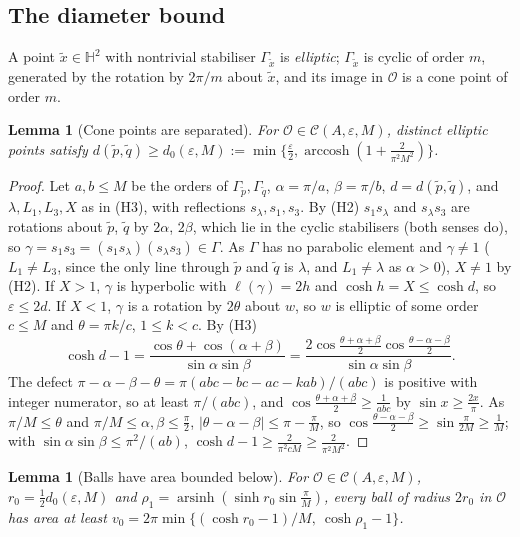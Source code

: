 \documentclass[pdflatex,sn-mathphys-num]{sn-jnl}
\theoremstyle{thmstyleone}%
\newtheorem{lemma}[theorem]{Lemma}%
\theoremstyle{thmstylethree}%
\newcommand{\Orb}{\mathcal{O}}
\newcommand{\Cl}{\mathcal{C}}
\newcommand{\Hb}{\mathbb{H}^2}
\begin{document}
\subsection{The diameter bound}

A point $\tilde x\in\Hb$ with nontrivial stabiliser $\Gamma_{\tilde x}$ is \emph{elliptic}; $\Gamma_{\tilde x}$ is cyclic of order $m$, generated by the rotation by $2\pi/m$ about $\tilde x$, and its image in $\Orb$ is a cone point of order $m$.

\begin{lemma}[Cone points are separated]\label{lem:sep}
For $\Orb\in\Cl(A,\varepsilon,M)$, distinct elliptic points satisfy $d(\tilde p,\tilde q)\ge d_0(\varepsilon,M):=\min\{\frac\varepsilon2,\operatorname{arccosh}(1+\frac2{\pi^2M^2})\}$.
\end{lemma}

\begin{proof}
Let $a,b\le M$ be the orders of $\Gamma_{\tilde p},\Gamma_{\tilde q}$, $\alpha=\pi/a$, $\beta=\pi/b$, $d=d(\tilde p,\tilde q)$, and $\lambda,L_1,L_3,X$ as in (H3), with reflections $s_\lambda,s_1,s_3$. By (H2) $s_1s_\lambda$ and $s_\lambda s_3$ are rotations about $\tilde p$, $\tilde q$ by $2\alpha$, $2\beta$, which lie in the cyclic stabilisers (both senses do), so $\gamma=s_1s_3=(s_1s_\lambda)(s_\lambda s_3)\in\Gamma$. As $\Gamma$ has no parabolic element and $\gamma\ne1$ ($L_1\ne L_3$, since the only line through $\tilde p$ and $\tilde q$ is $\lambda$, and $L_1\ne\lambda$ as $\alpha>0$), $X\ne1$ by (H2). If $X>1$, $\gamma$ is hyperbolic with $\ell(\gamma)=2h$ and $\cosh h=X\le\cosh d$, so $\varepsilon\le2d$. If $X<1$, $\gamma$ is a rotation by $2\theta$ about $w$, so $w$ is elliptic of some order $c\le M$ and $\theta=\pi k/c$, $1\le k<c$. By (H3)
\[
  \cosh d-1=\frac{\cos\theta+\cos(\alpha+\beta)}{\sin\alpha\sin\beta}=\frac{2\cos\frac{\theta+\alpha+\beta}2\cos\frac{\theta-\alpha-\beta}2}{\sin\alpha\sin\beta}.
\]
The defect $\pi-\alpha-\beta-\theta=\pi(abc-bc-ac-kab)/(abc)$ is positive with integer numerator, so at least $\pi/(abc)$, and $\cos\frac{\theta+\alpha+\beta}2\ge\frac1{abc}$ by $\sin x\ge\frac{2x}\pi$. As $\pi/M\le\theta$ and $\pi/M\le\alpha,\beta\le\frac\pi2$, $|\theta-\alpha-\beta|\le\pi-\frac\pi M$, so $\cos\frac{\theta-\alpha-\beta}2\ge\sin\frac\pi{2M}\ge\frac1M$; with $\sin\alpha\sin\beta\le\pi^2/(ab)$, $\cosh d-1\ge\frac2{\pi^2cM}\ge\frac2{\pi^2M^2}$.
\end{proof}

\begin{lemma}[Balls have area bounded below]\label{lem:balls}
For $\Orb\in\Cl(A,\varepsilon,M)$, $r_0=\frac12d_0(\varepsilon,M)$ and $\rho_1=\operatorname{arsinh}(\sinh r_0\sin\frac\pi M)$, every ball of radius $2r_0$ in $\Orb$ has area at least $v_0=2\pi\min\{(\cosh r_0-1)/M,\ \cosh\rho_1-1\}$.
\end{lemma}
\end{document}
